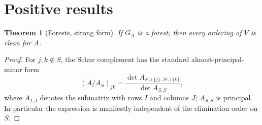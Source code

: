 \documentclass[11pt]{article}
\theoremstyle{plain}
\newtheorem{theorem}{Theorem}[section]
\theoremstyle{definition}
\begin{document}
\section{Positive results}\label{sec:positive}

\begin{aiblock}
\begin{theorem}[Forests, strong form]\label{thm:forest}
If $G_A$ is a forest, then every ordering of $V$ is clean for $A$.
\end{theorem}
\begin{proof}
For $j,k\notin S$, the Schur complement has the standard almost-principal-minor form
\[
(A/A_S)_{jk}= \frac{\det A_{S\cup\{j\},\,S\cup\{k\}}}{\det A_{S,S}},
\]
where $A_{I,J}$ denotes the submatrix with rows $I$ and columns $J$; $A_{S,S}$ is principal. In particular the expression is manifestly independent of the elimination order on $S$.


\end{proof}
\end{aiblock}
\end{document}

